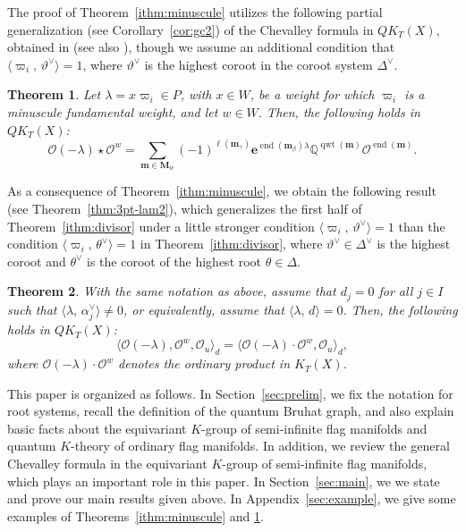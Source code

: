 \documentclass[11pt,a4paper,reqno,dvipdfmx]{amsart}
\numberwithin{equation}{section}
\newcommand{\BQ}{\mathbb{Q}}
\newcommand{\CO}{\mathcal{O}}
\newcommand{\be}{\mathbf{e}}
\newcommand{\bm}{\mathbf{m}}
\newcommand{\bM}{\mathbf{M}}
\DeclareMathOperator{\qwt}{qwt}
\DeclareMathOperator{\ed}{end}
\newcommand{\pair}[2]{\langle #1,\,#2 \rangle}
\theoremstyle{plain}
\newtheorem{ithm}{Theorem}
\theoremstyle{definition}
\theoremstyle{remark}
\begin{document}
The proof of Theorem~\ref{ithm:minuscule} utilizes 
the following partial generalization (see Corollary~\ref{cor:gc2}) of the Chevalley formula 
in $QK_T(X)$, obtained in \cite{LNS} (see also \cite{NOS}), 
though we assume an additional condition that 
$\pair{\varpi_i}{\vartheta^{\vee}} = 1$, 
where $\vartheta^{\vee}$ is the highest coroot 
in the coroot system $\Delta^{\vee}$. 
%
%
\begin{ithm}\label{ithm:gchevalley}
Let $\lambda = x \varpi_i \in P$, with $x \in W$, be a weight 
for which $\varpi_i$ is a minuscule fundamental weight, 
and let $w \in W$. Then, the following holds in $QK_T(X)${\rm :} 
%
\begin{equation}
\CO(- \lambda) \star \CO^w = 
\sum_{\bm \in \bM_{w}} (-1)^{\ell(\bm_{\gamma})} 
\be^{\ed(\bm_{\beta}) \lambda} \BQ^{\qwt(\bm)} \CO^{\ed(\bm)}.
\end{equation} 
%
\end{ithm}

As a consequence of Theorem~\ref{ithm:minuscule}, 
we obtain the following result (see Theorem~\ref{thm:3pt-lam2}), which generalizes the first half of 
Theorem~\ref{ithm:divisor} under a little stronger condition 
$\pair{\varpi_i}{\vartheta^{\vee}} = 1$ than 
the condition $\pair{\varpi_i}{\theta^{\vee}} = 1$ 
in Theorem~\ref{ithm:divisor}, where $\vartheta^{\vee} \in \Delta^{\vee}$ is 
the highest coroot and $\theta^{\vee}$ is 
the coroot of the highest root $\theta \in \Delta$. 
%
%
\begin{ithm}\label{ithm:gdivisor}
With the same notation as above, assume that $d_j = 0$ for all $j \in I$ such that $\pair{\lambda}{\alpha_j^{\vee}} \not= 0$, or equivalently, assume that $\pair{\lambda}{d} = 0$. 
Then, the following holds in $QK_T(X)${\rm :}
%
\begin{equation}
\langle \CO(- \lambda), \CO^{w}, \CO_{u} \rangle_{d} =  
\langle \CO(- \lambda) \cdot \CO^{w}, \CO_{u} \rangle_{d},
\end{equation}
%
where $\CO(- \lambda) \cdot \CO^{w}$ denotes the ordinary product in $K_{T}(X)$. 
\end{ithm}

This paper is organized as follows. 
In Section~\ref{sec:prelim}, 
we fix the notation for root systems, recall the definition of 
the quantum Bruhat graph, and also explain basic facts about the equivariant $K$-group of 
semi-infinite flag manifolds and quantum $K$-theory of ordinary flag manifolds. 
In addition, we review the general Chevalley formula in the equivariant $K$-group 
of semi-infinite flag manifolds, which plays an important role 
in this paper. In Section~\ref{sec:main}, 
we we state and prove our main results given above. 
In Appendix~\ref{sec:example}, we give some examples of Theorems~\ref{ithm:minuscule} and \ref{ithm:gchevalley}. 
\end{document}
